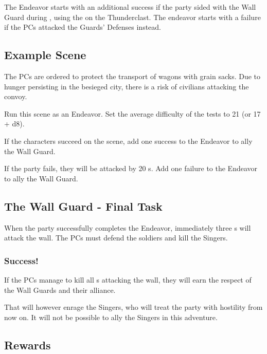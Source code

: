 The Endeavor starts with an additional success if the party sided with the Wall Guard during , using the \lootDustcaster{} on the Thunderclast. The endeavor starts with a failure if the PCs attacked the Guards' Defenses instead.



\subsection{Example Scene}

The PCs are ordered to protect the transport of wagons with grain sacks. Due to hunger persisting in the besieged city, there is a risk of civilians attacking the convoy.

Run this scene as an Endeavor. Set the average difficulty of the tests to 21 (or 17 + d8). 

If the characters succeed on the scene, add one success to the Endeavor to ally the Wall Guard.

If the party fails, they will be attacked by 20  \enemyRioter{}s. Add one failure to the Endeavor to ally the Wall Guard.



\subsection{The Wall Guard - Final Task}
\label{ssec:theWallFinalTask}

When the party successfully completes the Endeavor, immediately three \enemySingerHaevenlyOne{}s will attack the wall. The PCs must defend the soldiers and kill the Singers. 

\subsubsection{Success!}

If the PCs manage to kill all \enemySingerHaevenlyOne{}s attacking the wall, they will earn the respect of the Wall Guards and their alliance.

That will however enrage the Singers, who will treat the party with hostility from now on. It will not be possible to ally the Singers in this adventure.




\subsection{Rewards}

